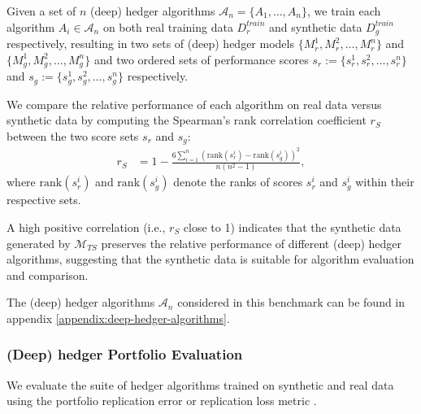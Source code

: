 \documentclass[sigconf]{acmart}
\begin{document}
      Given a set of \( n \) (deep) hedger algorithms 
      \( \mathcal{A}_n = \{ A_1, \ldots, A_n \} \), we train 
      each algorithm \( A_i \in \mathcal{A}_n \) on both real 
      training data \( D_r^{train} \) and synthetic data 
      \( D_g^{train} \) respectively, resulting in two sets of 
      (deep) hedger models \(\{M_r^1, M_r^2, \ldots, M_r^n\} \) 
      and \( \{M_g^1, M_g^2, \ldots, M_g^n\} \) and two ordered 
      sets of performance scores 
      \( s_r := \{s_r^1, s_r^2, \ldots, s_r^n\} \) and 
      \( s_g := \{s_g^1, s_g^2, \ldots, s_g^n\} \) respectively.

      We compare the relative performance of each 
      algorithm on real data versus synthetic data by computing 
      the Spearman's rank correlation coefficient \( r_S \) 
      \cite{Lin21} between the two score sets \( s_r \) and 
      \( s_g \):
      \begin{equation}
        \begin{aligned}
          r_S &= 1 - \frac{6 \sum_{i=1}^{n} ( \mathrm{rank}(s_r^i) 
          - \mathrm{rank}(s_g^i) )^2}{n(n^2 - 1)},
        \end{aligned}
        \label{eq:Spearman}
      \end{equation}
      where \( \mathrm{rank}(s_r^i) \) and 
      \( \mathrm{rank}(s_g^i) \) denote the ranks of scores 
      \( s_r^i \) and \( s_g^i \) within their respective sets.

      A high positive correlation (i.e., \( r_S \) 
      close to 1) indicates that the synthetic data 
      generated by \( \mathcal{M}_{TS} \) preserves the relative 
      performance of different (deep) hedger algorithms, suggesting 
      that the synthetic data is suitable for algorithm evaluation 
      and comparison.

      The (deep) hedger algorithms \( \mathcal{A}_n \) considered in 
      this benchmark can be found in appendix 
      \ref{appendix:deep-hedger-algorithms}.

      \subsubsection{(Deep) hedger Portfolio Evaluation}
      We evaluate the suite of hedger algorithms trained on 
      synthetic and real data using the portfolio replication error 
      or replication loss metric \cite{Boursin22}.
\end{document}
